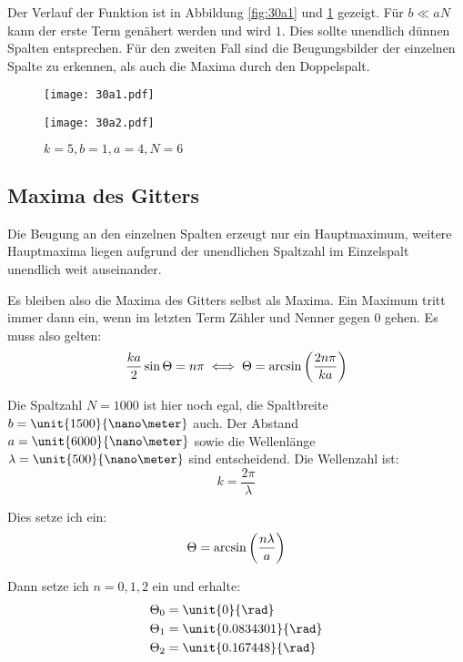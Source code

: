 Der Verlauf der Funktion ist in Abbildung \ref{fig:30a1} und \ref{fig:30a2}
gezeigt. Für $b \ll a N$ kann der erste Term genähert werden und wird $1$. Dies
sollte unendlich dünnen Spalten entsprechen. Für den zweiten Fall sind die
Beugungsbilder der einzelnen Spalte zu erkennen, als auch die Maxima durch den
Doppelspalt.

\begin{figure}
	\centering
	\begin{minipage}{0.45\textwidth}
		\centering
		\texttt{[image: 30a1.pdf]}
		\caption{$k = 300, b = 0.1, a = 3, N = 1$}
		\label{fig:30a1}
	\end{minipage}
	\hspace{0.08\textwidth}
	\begin{minipage}{0.45\textwidth}
		\centering
		\texttt{[image: 30a2.pdf]}
		\caption{$k = 5, b = 1, a = 4, N = 6$}
		\label{fig:30a2}
	\end{minipage}
\end{figure}

\subsection{Maxima des Gitters}

Die Beugung an den einzelnen Spalten erzeugt nur ein Hauptmaximum, weitere
Hauptmaxima liegen aufgrund der unendlichen Spaltzahl im Einzelspalt unendlich
weit auseinander.

Es bleiben also die Maxima des Gitters selbst als Maxima. Ein Maximum tritt immer dann ein, wenn im letzten Term Zähler und Nenner gegen 0 gehen. Es muss also gelten:
\[
	\frac{ka}{2} \sin \Theta = n \pi
	\iff
	\Theta = \arcsin\del{\frac{2 n \pi}{ka}}
\]

Die Spaltzahl $N = 1000$ ist hier noch egal, die Spaltbreite $b = \unit{1500}{\nano\meter}$ auch. Der Abstand $a = \unit{6000}{\nano\meter}$ sowie die Wellenlänge $\lambda = \unit{500}{\nano\meter}$ sind entscheidend. Die Wellenzahl ist:
\[
	k = \frac{2 \pi}{\lambda}
\]

Dies setze ich ein:
\[
	\Theta = \arcsin\del{\frac{n \lambda}{a}}
\]

Dann setze ich $n = 0, 1, 2$ ein und erhalte:
\begin{align*}
	\Theta_0 &= \unit{0}{\rad} \\
	\Theta_1 &= \unit{0.0834301}{\rad} \\
	\Theta_2 &= \unit{0.167448}{\rad} \\
\end{align*}

